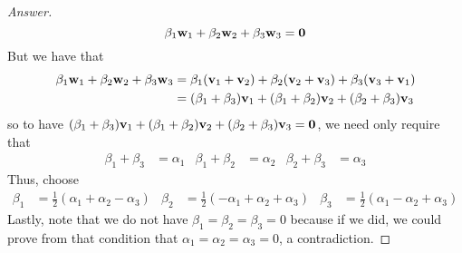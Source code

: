 \documentclass[../psets.tex]{subfiles}
\begin{document}
\begin{enumerate}[label={\textbf{2.\arabic*.}}]
\begin{proof}[Answer]
        \begin{equation*}
            \beta_1\mathbf{w}_1+\beta_2\mathbf{w}_2+\beta_3\mathbf{w}_3 = \bm{0}
        \end{equation*}
        But we have that
        \begin{align*}
            \beta_1\mathbf{w}_1+\beta_2\mathbf{w}_2+\beta_3\mathbf{w}_3 &= \beta_1(\mathbf{v}_1+\mathbf{v}_2)+\beta_2(\mathbf{v}_2+\mathbf{v}_3)+\beta_3(\mathbf{v}_3+\mathbf{v}_1)\\
            &= (\beta_1+\beta_3)\mathbf{v}_1+(\beta_1+\beta_2)\mathbf{v}_2+(\beta_2+\beta_3)\mathbf{v}_3
        \end{align*}
        so to have $(\beta_1+\beta_3)\mathbf{v}_1+(\beta_1+\beta_2)\mathbf{v}_2+(\beta_2+\beta_3)\mathbf{v}_3=\bm{0}$, we need only require that
        \begin{align*}
            \beta_1+\beta_3 &= \alpha_1&
            \beta_1+\beta_2 &= \alpha_2&
            \beta_2+\beta_3 &= \alpha_3
        \end{align*}
        Thus, choose
        \begin{align*}
            \beta_1 &= \frac{1}{2}(\alpha_1+\alpha_2-\alpha_3)&
            \beta_2 &= \frac{1}{2}(-\alpha_1+\alpha_2+\alpha_3)&
            \beta_3 &= \frac{1}{2}(\alpha_1-\alpha_2+\alpha_3)
        \end{align*}
        Lastly, note that we do not have $\beta_1=\beta_2=\beta_3=0$ because if we did, we could prove from that condition that $\alpha_1=\alpha_2=\alpha_3=0$, a contradiction.
    \end{proof}
\end{enumerate}
\end{document}
